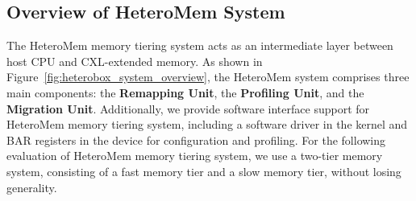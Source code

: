

\subsection{Overview of HeteroMem System}



The HeteroMem memory tiering system acts as an intermediate layer between host CPU and CXL-extended memory. 
As shown in Figure~\ref{fig:heterobox_system_overview}, the HeteroMem system comprises three main components: the \textbf{Remapping Unit}, the \textbf{Profiling Unit}, and the \textbf{Migration Unit}. 
Additionally, we provide software interface support for HeteroMem memory tiering system, including a software driver in the kernel and BAR registers in the device for configuration and profiling. 
For the following evaluation of HeteroMem memory tiering system, we use a two-tier memory system, consisting of a fast memory tier and a slow memory tier, without losing generality.






